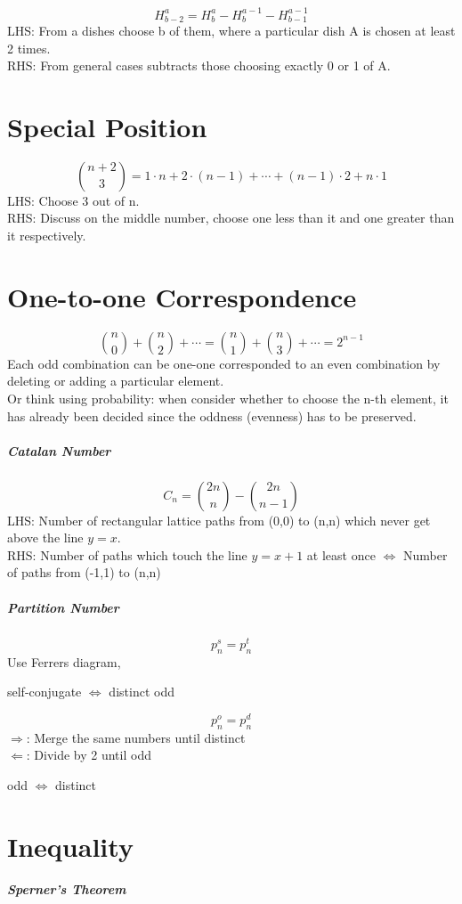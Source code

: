 \documentclass{article}
\begin{document}
	$$ H_{b-2}^a = H_b^a - H_b^{a-1} - H_{b-1}^{a-1}$$
	LHS: From a dishes choose b of them, where a particular dish A is chosen at least 2 times.\\
	RHS: From general cases subtracts those choosing exactly 0 or 1 of A.

	\section{Special Position}
	$${n+2 \choose 3} = 1 \cdot n + 2 \cdot (n-1) + \cdots + (n-1) \cdot 2 + n \cdot 1 $$
	LHS: Choose 3 out of n.\\
	RHS: Discuss on the middle number, choose one less than it and one greater than it respectively.

	\section{One-to-one Correspondence}
	$$ {n \choose 0} + {n \choose 2} + \cdots = {n \choose 1} + {n \choose 3} + \cdots = 2^{n-1} $$
	Each odd combination can be one-one corresponded to an even combination by deleting or adding a particular element.\\
	Or think using probability: when consider whether to choose the n-th element, it has already been decided since the oddness (evenness) has to be preserved.

	\subparagraph{Catalan Number}
	$$C_n = {2n \choose n} - {2n \choose n-1}$$
	LHS: Number of rectangular lattice paths from (0,0) to (n,n) which never get above the line $y=x$.\\
	RHS: Number of paths which touch the line $y=x+1$ at least once $\Leftrightarrow$ Number of paths from (-1,1) to (n,n) 

	\subparagraph{Partition Number}
	$$ p_n^s = p_n^t $$
	Use Ferrers diagram, \begin{center} self-conjugate $\Leftrightarrow$ distinct odd \end{center}

	$$ p_n^o = p_n^d $$
	$\Rightarrow$: Merge the same numbers until distinct \\
	$\Leftarrow$: Divide by 2 until odd\\
	\begin{center} odd $\Leftrightarrow$ distinct \end{center}


	\section{Inequality}
	\subparagraph{Sperner's Theorem}\leavevmode
	
\end{document}

